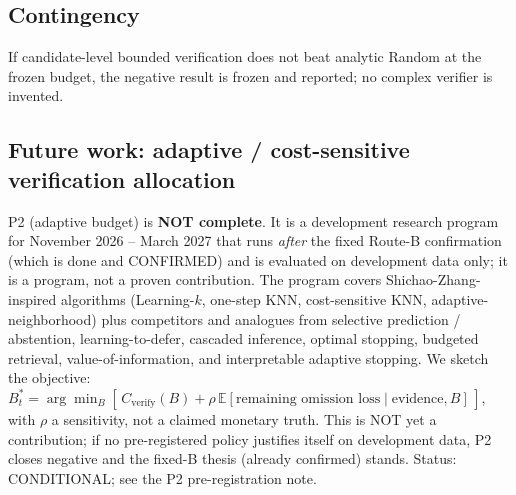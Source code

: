 \documentclass[11pt,a4paper]{article}
\begin{document}
\subsection{Contingency}
If candidate-level bounded verification does not beat analytic Random at the
frozen budget, the negative result is frozen and reported; no complex verifier
is invented.

\subsection{Future work: adaptive / cost-sensitive verification allocation}
P2 (adaptive budget) is \textbf{NOT complete}. It is a development research
program for November 2026 -- March 2027 that runs \emph{after} the fixed
Route-B confirmation (which is done and CONFIRMED) and is evaluated on
development data only; it is a program, not a proven contribution. The program
covers Shichao-Zhang-inspired algorithms (Learning-$k$, one-step KNN,
cost-sensitive KNN, adaptive-neighborhood)
\cite{zhang_tkde2022_challenges,zhang_tkde2021_onestep,zhang_neurom2020_costsensitive,zhang_tkde2022_reachable}
plus competitors and analogues from selective prediction / abstention,
learning-to-defer, cascaded inference, optimal stopping, budgeted retrieval,
value-of-information, and interpretable adaptive stopping. We sketch the
objective: $B_t^* = \arg\min_B [\,C_{\text{verify}}(B) + \rho\,\mathbb{E}[\text{remaining omission
loss}\mid \text{evidence}, B]\,]$, with $\rho$ a sensitivity, not a claimed
monetary truth. This is NOT yet a contribution; if no pre-registered policy
justifies itself on development data, P2 closes negative and the fixed-B thesis
(already confirmed) stands. Status: CONDITIONAL; see the P2 pre-registration
note.
\end{document}
